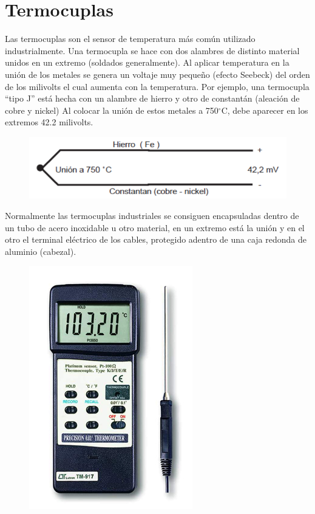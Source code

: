 \documentclass[a4paper,11pt]{report}
\begin{document}
\section{Termocuplas}
Las termocuplas son el sensor de temperatura más común utilizado industrialmente.
Una termocupla se hace con dos alambres de distinto material unidos en un extremo (soldados generalmente). Al aplicar temperatura en la unión de los metales se genera un voltaje muy pequeño (efecto Seebeck) del orden de los milivolts el cual aumenta con la temperatura. Por ejemplo, una termocupla ``tipo J'' está hecha con un alambre de hierro y otro de constantán (aleación de cobre y nickel) Al colocar la unión de estos metales a 750$^{\circ}$C, debe aparecer en los extremos 42.2 milivolts.
\begin{figure}[H]
\begin{center}
\includegraphics[scale=0.5]{termocupla1.png}
\end{center}
\end{figure}
Normalmente las termocuplas industriales se consiguen encapsuladas dentro de un tubo de acero inoxidable u otro material, en un extremo está la unión y en el otro el terminal eléctrico de los cables, protegido adentro de una caja redonda de aluminio (cabezal).
\begin{figure}[H]
\begin{center}
\includegraphics[scale=0.5]{termocupla2.jpg}
\end{center}
\end{figure}
\end{document}

